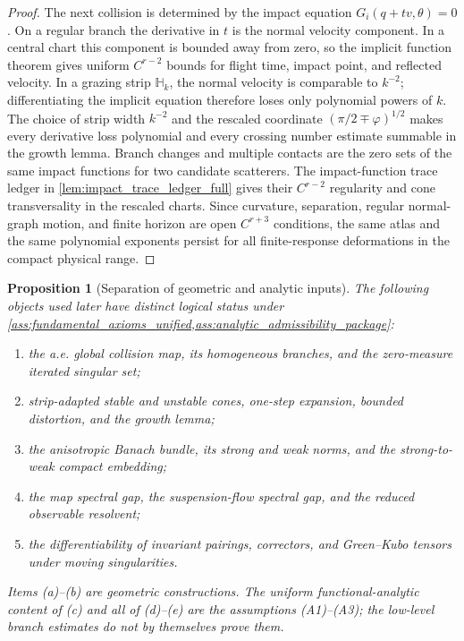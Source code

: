\documentclass[12pt, letterpaper]{amsart}
\theoremstyle{plain}
\newtheorem{proposition}[theorem]{Proposition}
\theoremstyle{definition}
\theoremstyle{remark}
\begin{document}
\begin{proof}
The next collision is determined by the impact equation
$G_i(q+t v,\theta)=0$.  On a regular branch the derivative in $t$ is the normal
velocity component.  In a central chart this component is bounded away from
zero, so the implicit function theorem gives uniform $C^{r-2}$ bounds for
flight time, impact point, and reflected velocity.  In a grazing strip
$\mathbb H_k$, the normal velocity is comparable to $k^{-2}$; differentiating
the implicit equation therefore loses only polynomial powers of $k$.  The
choice of strip width $k^{-2}$ and the rescaled coordinate
$(\pi/2\mp\varphi)^{1/2}$ makes every derivative loss polynomial and every
crossing number estimate summable in the growth lemma.  Branch changes and
multiple contacts are the zero sets of the same impact functions for two
candidate scatterers.  The impact-function trace ledger in \cref{lem:impact_trace_ledger_full} gives their
$C^{r-2}$ regularity and cone transversality in the rescaled charts.  Since
curvature, separation, regular normal-graph motion, and finite horizon are open
$C^{r+3}$ conditions, the same atlas and the same polynomial exponents persist
for all finite-response deformations in the compact physical range.
\end{proof}

\begin{proposition}[Separation of geometric and analytic inputs]
\label{prop:no_hidden_dynamical_input}
The following objects used later have distinct logical status under
\cref{ass:fundamental_axioms_unified,ass:analytic_admissibility_package}:
\begin{enumerate}[label=\textup{(\alph*)}, wide, labelindent=0pt]
    \item the a.e. global collision map, its homogeneous branches, and the
    zero-measure iterated singular set;
    \item strip-adapted stable and unstable cones, one-step expansion, bounded
    distortion, and the growth lemma;
    \item the anisotropic Banach bundle, its strong and weak norms, and the
    strong-to-weak compact embedding;
    \item the map spectral gap, the suspension-flow spectral gap, and the
    reduced observable resolvent;
    \item the differentiability of invariant pairings, correctors, and
    Green--Kubo tensors under moving singularities.
\end{enumerate}
Items (a)--(b) are geometric constructions.  The uniform functional-analytic
content of (c) and all of (d)--(e) are the assumptions \textup{(A1)--(A3)};
the low-level branch estimates do not by themselves prove them.
\end{proposition}
\end{document}

